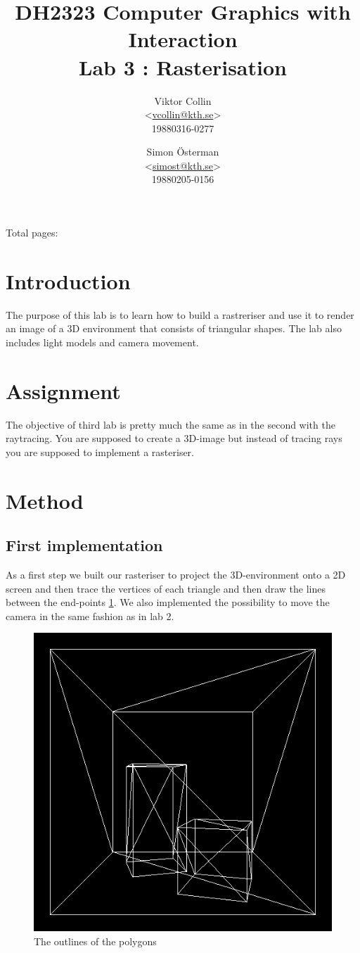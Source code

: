 \documentclass[a4paper,11pt]{article}
\author{Viktor Collin \\ <\url{vcollin@kth.se}> \\ 19880316-0277 \and Simon \"{O}sterman \\ <\url{simost@kth.se}> \\ 19880205-0156}
\title{\textbf{DH2323 Computer Graphics with Interaction \\ Lab 3 : Rasterisation}}
\begin{document}
\maketitle
\begin{center}
Total pages: \pageref{LastPage}
\end{center}
\thispagestyle{empty}

\clearpage
\setcounter{page}{1}
\section{Introduction}
The purpose of this lab is to learn how to build a rastreriser and use it to render an image of a 3D environment that consists of triangular shapes. The lab also includes light models and camera movement. 
\section{Assignment}
The objective of third lab is pretty much the same as in the second with the raytracing. You are supposed to create a 3D-image but instead of tracing rays you are supposed to implement a rasteriser.
\section{Method}
\subsection{First implementation}
As a first step we built our rasteriser to project the 3D-environment onto a 2D screen and then trace the vertices of each triangle and then draw the lines between the end-points \ref{fig1}. We also implemented the possibility to move the camera in the same fashion as in lab 2. 

\begin{figure}[h!]
	\centering	
	\includegraphics[width=0.45\linewidth]{screenshot1.png}
	\caption{The outlines of the polygons}
	\label{fig1}
\end{figure}
\clearpage
\end{document}

